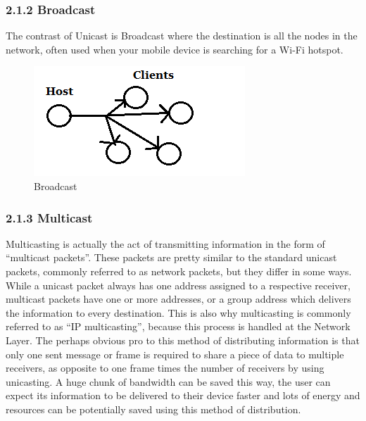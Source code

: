 \documentclass[9pt,a4paper]{acmproc}
\begin{document}
\subsubsection*{2.1.2 Broadcast}

The contrast of Unicast is Broadcast where the destination is all the nodes in the network, often used when your mobile device is searching for a Wi-Fi hotspot.
\begin{figure}[h!]
\includegraphics[width=\linewidth]{broadcast.png}
\caption{Broadcast}
\label{fig:Broadcast}
\end{figure}

\subsubsection*{2.1.3 Multicast}





	Multicasting is actually the act of transmitting information in the form of “multicast packets”. These packets are pretty similar to the standard unicast packets, commonly referred to as network packets, but they differ in some ways. While a unicast packet always has one address assigned to a respective receiver, multicast packets have one or more addresses, or a group address which delivers the information to every destination. This is also why multicasting is commonly referred to as “IP multicasting”, because this process is handled at the Network Layer. The perhaps obvious pro to this method of distributing information is that only one sent message or frame is required to share a piece of data to multiple receivers, as opposite to one frame times the number of receivers by using unicasting. A huge chunk of bandwidth can be saved this way, the user can expect its information to be delivered to their device faster and lots of energy and resources can be potentially saved using this method of distribution.
	
\end{document}
